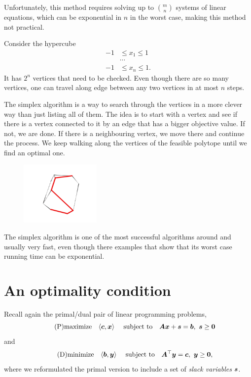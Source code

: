 Unfortunately, this method requires solving up to $\binom{m}{n}$ systems of linear equations, which can be exponential in $n$ in the worst case, making this method not practical. 

\begin{example}
Consider the hypercube
\begin{align*}
 -1&\leq x_1\leq 1\\
 &\cdots\\
 -1&\leq x_n\leq 1.
\end{align*}
It has $2^n$ vertices that need to be checked. Even though there are so many vertices, one can travel along edge between any two vertices in at most $n$ steps.
\end{example}


The simplex algorithm is a way to search through the vertices in a more clever way than just listing all of them. The idea is to start with a vertex and see if there is a vertex connected to it by an edge that has a bigger objective value. If not, we are done. If there is a neighbouring vertex, we move there and continue the process. We keep walking along the vertices of the feasible polytope until we find an optimal one.
\begin{figure}[h!]
\centering
 \includegraphics[width=0.35\textwidth]{images/durerpath.jpg}
\end{figure}
The simplex algorithm is one of the most successful algorithms around and usually very fast, even though there examples that show that its worst case running time can be exponential.

\section{An optimality condition}
Recall again the primal/dual pair of linear programming problems,
\begin{equation}\label{eq:primal1}\tag{P}
 \text{maximize}\quad \langle {\bm{c}}, {\bm{x}} \rangle \ \quad\text{subject to}\quad \bm{A}\bm{x}+\bm{s}= \bm{b}, \ \bm{s}\geq \bm{0}
\end{equation}
and
\begin{equation}\label{eq:dual1}\tag{D}
 \text{minimize}\quad \langle {\bm{b}}, {\bm{y}} \rangle \ \quad\text{subject to}\quad \bm{A}^{\top}\bm{y}=\bm{c}, \  \bm{y}\geq \bm{0},
\end{equation}
where we reformulated the primal version to include a set of {\em slack variables} $\bm{s}$.

